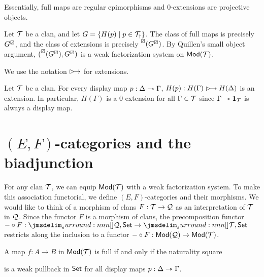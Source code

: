 \documentclass[a4paper]{article}
\begin{document}
\begin{remark}
  Essentially, full maps are regular epimorphisms and $0$-extensions are projective objects.
\end{remark}

\begin{remark}
  Let $\mathcal{T}$ be a clan, and let $G = \{H(p) \mid p \in \mathcal{T}_{\dag}\}$.
  The class of full maps is precisely $G^{\boxslash}$, and the class of extensions is precisely $\prescript{\boxslash}{}{(G^{\boxslash})}$.
  By Quillen's small object argument, $(\prescript{\boxslash}{}{(G^{\boxslash})},G^{\boxslash})$ is a weak factorization system on $\mathsf{Mod}(\mathcal{T})$.
\end{remark}

\begin{notation}
  We use the notation $\extension$ for extensions.
\end{notation}

\begin{remark}
  Let $\mathcal{T}$ be a clan.
  For every display map $p : \Delta \rightarrowtriangle \Gamma$, $H(p) : H(\Gamma) \extension H(\Delta)$ is an extension.
  In particular, $H(\Gamma)$ is a $0$-extension for all $\Gamma \in \mathcal{T}$ since $\Gamma \rightarrowtriangle \mathbf{1}_{\mathcal{T}}$ is always a display map.
\end{remark}

\section{$(E,F)$-categories and the biadjunction}
For any clan $\mathcal{T}$, we can equip $\mathsf{Mod}(\mathcal{T})$ with a weak factorization system.
To make this association functorial, we define $(E,F)$-categories and their morphisms.
We would like to think of a morphism of clans $F : \mathcal{T} \to \mathcal{Q}$ as an interpretation of $\mathcal{T}$ in $\mathcal{Q}$.
Since the functor $F$ is a morphism of clans, the precomposition functor $- \circ F : \funCat{\cQ}{\Set} \to \funCat{\cT}{\Set}$ restricts along the inclusion to a functor $- \circ F : \mathsf{Mod}(\mathcal{Q}) \to \mathsf{Mod}(\mathcal{T})$.

\begin{remark}
  A map $f : A \to B$ in $\mathsf{Mod}(\mathcal{T})$ is full if and only if the naturality square
  \begin{center}
  \end{center}
  is a weak pullback in $\mathsf{Set}$ for all display maps $p : \Delta \rightarrowtriangle \Gamma$.
\end{remark}
\end{document}
